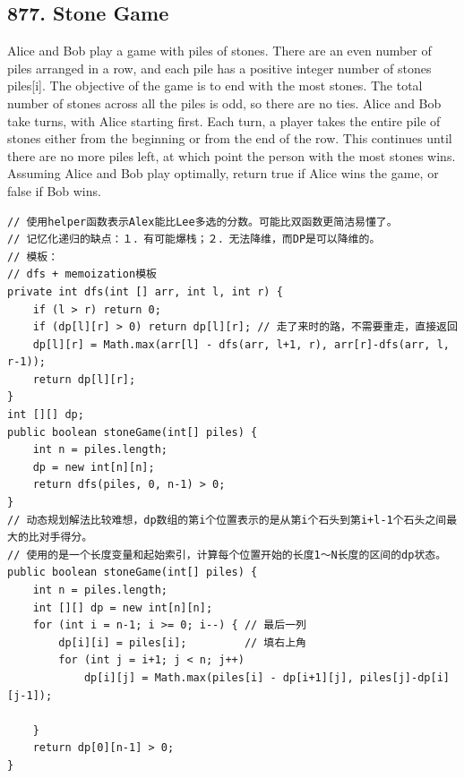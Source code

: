 \documentclass[9pt, b5paper]{article}
\begin{document}
\subsection{877. Stone Game}
\label{sec-4-22}
Alice and Bob play a game with piles of stones. There are an even number of piles arranged in a row, and each pile has a positive integer number of stones piles[i].
The objective of the game is to end with the most stones. The total number of stones across all the piles is odd, so there are no ties.
Alice and Bob take turns, with Alice starting first. Each turn, a player takes the entire pile of stones either from the beginning or from the end of the row. This continues until there are no more piles left, at which point the person with the most stones wins.
Assuming Alice and Bob play optimally, return true if Alice wins the game, or false if Bob wins.
\begin{verbatim}
// 使用helper函数表示Alex能比Lee多选的分数。可能比双函数更简洁易懂了。
// 记忆化递归的缺点：１．有可能爆栈；２．无法降维，而DP是可以降维的。
// 模板：
// dfs + memoization模板
private int dfs(int [] arr, int l, int r) {
    if (l > r) return 0;
    if (dp[l][r] > 0) return dp[l][r]; // 走了来时的路，不需要重走，直接返回
    dp[l][r] = Math.max(arr[l] - dfs(arr, l+1, r), arr[r]-dfs(arr, l, r-1));
    return dp[l][r];
}
int [][] dp; 
public boolean stoneGame(int[] piles) {
    int n = piles.length;
    dp = new int[n][n];
    return dfs(piles, 0, n-1) > 0;
}
// 动态规划解法比较难想，dp数组的第i个位置表示的是从第i个石头到第i+l-1个石头之间最大的比对手得分。
// 使用的是一个长度变量和起始索引，计算每个位置开始的长度1～N长度的区间的dp状态。
public boolean stoneGame(int[] piles) {
    int n = piles.length;
    int [][] dp = new int[n][n];
    for (int i = n-1; i >= 0; i--) { // 最后一列
        dp[i][i] = piles[i];         // 填右上角
        for (int j = i+1; j < n; j++) 
            dp[i][j] = Math.max(piles[i] - dp[i+1][j], piles[j]-dp[i][j-1]);

    }
    return dp[0][n-1] > 0;
}
\end{verbatim}
\end{document}
